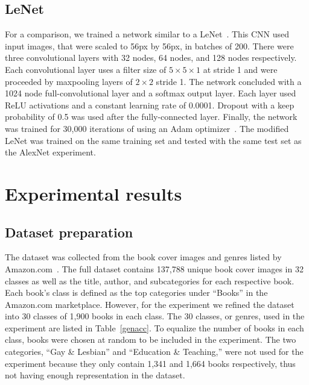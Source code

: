 \documentclass[conference]{IEEEtran}
\begin{document}
\subsection{LeNet}
For a comparison, we trained a network similar to a LeNet~\cite{lecun1998gradient}.
This CNN used input images, that were scaled to 56px by 56px, in batches of 200.
There were three convolutional layers with 32 nodes, 64 nodes, and 128 nodes respectively.
Each convolutional layer uses a filter size of $5 \times 5 \times 1$ at stride 1 and were proceeded by maxpooling layers of $2 \times 2$ stride 1.
The network concluded with a 1024 node full-convolutional layer and a softmax output layer.
Each layer used ReLU activations and a constant learning rate of 0.0001.
Dropout with a keep probability of 0.5 was used after the fully-connected layer.
Finally, the network was trained for 30,000 iterations of using an Adam optimizer~\cite{kingma2014adam}. 
The modified LeNet was trained on the same training set and tested with the same test set as the AlexNet experiment.

\section{Experimental results}
\label{results}


\subsection{Dataset preparation}
\label{results:prep}
The dataset was collected from the book cover images and genres listed by Amazon.com~\cite{amazon}.
The full dataset contains 137,788 unique book cover images in 32 classes as well as the title, author, and subcategories for each respective book.
Each book's class is defined as the top categories under ``Books'' in the Amazon.com marketplace.
However, for the experiment we refined the dataset into 30 classes of 1,900 books in each class. 
The 30 classes, or genres, used in the experiment are listed in Table~\ref{genacc}.
To equalize the number of books in each class, books were chosen at random to be included in the experiment. 
The two categories, ``Gay \& Lesbian'' and ``Education \& Teaching,'' were not used for the experiment because they only contain 1,341 and 1,664 books respectively, thus not having enough representation in the dataset. 
\end{document}
